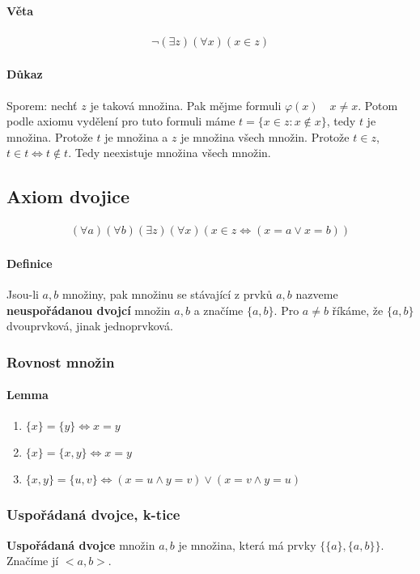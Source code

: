 \documentclass[a4paper,12pt,titlepage]{article}
\begin{document}
\paragraph{Věta}
\begin{align}
	\neg ( \exists z) (\forall x) (x \in z)
\end{align}
\paragraph{Důkaz}
Sporem: nechť $z$ je taková množina. Pak mějme formuli $\varphi(x) \quad x \neq
x$. Potom podle axiomu vydělení pro tuto formuli máme $t = \{x \in z : x \nin x
\}$, tedy $t$ je množina. Protože $t$ je množina a $z$ je množina všech množin.
Protože $t \in z$, $t \in t \Leftrightarrow t \nin t$. Tedy neexistuje množina
všech množin.

\subsection{Axiom dvojice}
\setcounter{equation}{0}
\begin{align}
	(\forall a) (\forall b) (\exists z) (\forall x) ( x \in z \Leftrightarrow (x
	= a \lor x = b ))
\end{align}
\paragraph{Definice}
Jsou-li $a, b$ množiny, pak množinu se stávající z prvků $a,b$ nazveme
\textbf{neuspořádanou dvojcí} množin $a,b$ a značíme $\{a,b\}$. Pro $a\neq b$
říkáme, že $\{a,b\}$ dvouprvková, jinak jednoprvková.

\subsubsection{Rovnost množin}
\setcounter{equation}{0}
\paragraph{Lemma}
\begin{enumerate}
	\item $\{x\} = \{y\} \Leftrightarrow x = y$
	\item $\{x\} = \{x,y\} \Leftrightarrow x = y$
	\item $\{x,y\} = \{u,v\} \Leftrightarrow (x = u \land y = v) \lor (x = v
	\land y = u)$
\end{enumerate}

\subsubsection{Uspořádaná dvojce, k-tice}
\setcounter{equation}{0}
\textbf{Uspořádaná dvojce} množin $a,b$ je množina, která má prvky $\{\{a\}, \{a,b\}\}$.
Značíme jí $<a,b>$.
\end{document}
